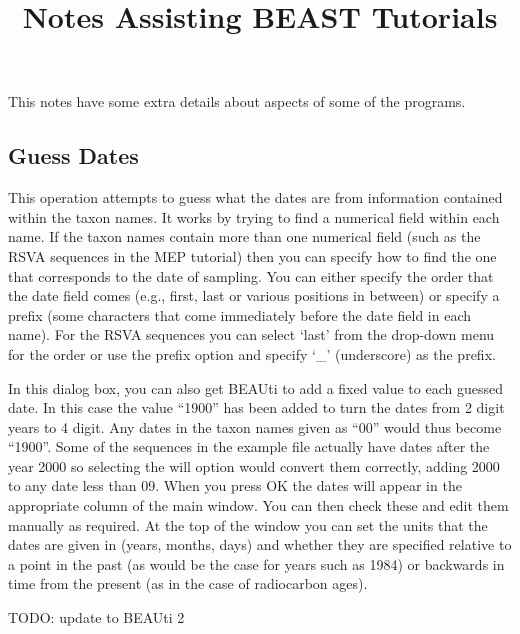 \documentclass[11pt]{article}
\begin{document}
\title{Notes Assisting BEAST Tutorials}
\date{}
\author{}
\maketitle

This notes have some extra details about aspects of some of the programs.

\subsection*{Guess Dates}

This operation attempts to guess what the dates are from information contained within the taxon names. It works by trying to
find a numerical field within each name. If the taxon names contain more than one numerical field (such as the RSVA
sequences in the MEP tutorial) then you can specify how to find the one that corresponds to the date of sampling. You can either
specify the order that the date field comes (e.g., first, last or various positions in between) or specify a prefix (some
characters that come immediately before the date field in each name). For the RSVA sequences you can select `last' from
the drop-down menu for the order or use the prefix option and specify `\_' (underscore) as the prefix.

In this dialog box, you can also get BEAUti to add a fixed value to each guessed date. In this case the value ``1900'' has
been added to turn the dates from 2 digit years to 4 digit. Any dates in the taxon names given as ``00'' would thus become
``1900''. Some of the sequences in the example file actually have dates after the year 2000 so selecting the will option would
convert them correctly, adding 2000 to any date less than 09. When you press OK the dates will appear in the appropriate
column of the main window. You can then check these and edit them manually as required. At the top of the window you
can set the units that the dates are given in (years, months, days) and whether they are specified relative to a point in the
past (as would be the case for years such as 1984) or backwards in time from the present (as in the case of radiocarbon
ages).

 TODO: update to BEAUti 2
\end{document}

